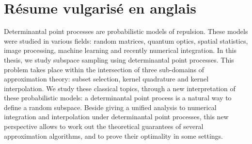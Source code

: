 \documentclass[twoside,11pt]{book}
\numberwithin{theorem}{chapter}
\numberwithin{definition}{chapter}
\numberwithin{proposition}{chapter}
\numberwithin{corollary}{chapter}
\numberwithin{example}{chapter}
\numberwithin{lemma}{chapter}
\numberwithin{assumption}{chapter}
\numberwithin{equation}{chapter}
\numberwithin{figure}{chapter}
\begin{document}
\section{Résume vulgarisé en anglais}

Determinantal point processes are probabilistic models of repulsion.
These models were studied in various fields: random matrices, quantum optics, spatial statistics, image processing, machine learning and recently numerical integration.
In this thesis, we study subspace sampling using determinantal point processes. This problem takes place within the intersection of three sub-domains of approximation theory: subset selection, kernel quadrature and kernel interpolation. We study these classical topics, through a new interpretation of these probabilistic models: a determinantal point process is a natural way to define a random  subspace. Beside giving a unified analysis to numerical integration and interpolation under determinantal point processes, this new perspective allows to work out the theoretical guarantees of several approximation algorithms, and to prove their optimality in some settings.
\end{document}
